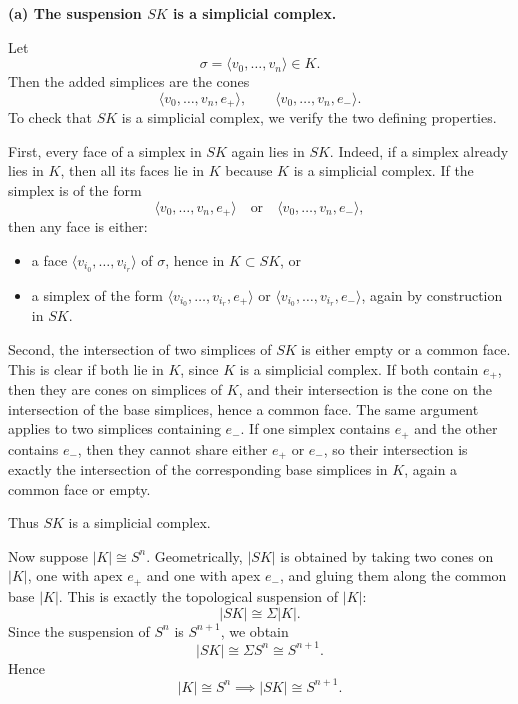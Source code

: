 \begin{solution}

\par

\textbf{(a) The suspension \(SK\) is a simplicial complex.}

Let
\[
\sigma=\langle v_0,\dots,v_n\rangle\in K.
\]
Then the added simplices are the cones
\[
\langle v_0,\dots,v_n,e_+\rangle,
\qquad
\langle v_0,\dots,v_n,e_-\rangle.
\]
To check that \(SK\) is a simplicial complex, we verify the two defining properties.

First, every face of a simplex in \(SK\) again lies in \(SK\). Indeed, if a simplex already lies in \(K\), then all its faces lie in \(K\) because \(K\) is a simplicial complex. If the simplex is of the form
\[
\langle v_0,\dots,v_n,e_+\rangle
\quad\text{or}\quad
\langle v_0,\dots,v_n,e_-\rangle,
\]
then any face is either:

\begin{itemize}
	\item a face \(\langle v_{i_0},\dots,v_{i_r}\rangle\) of \(\sigma\), hence in \(K\subset SK\), or
	\item a simplex of the form \(\langle v_{i_0},\dots,v_{i_r},e_+\rangle\) or \(\langle v_{i_0},\dots,v_{i_r},e_-\rangle\), again by construction in \(SK\).
\end{itemize}

Second, the intersection of two simplices of \(SK\) is either empty or a common face. This is clear if both lie in \(K\), since \(K\) is a simplicial complex. If both contain \(e_+\), then they are cones on simplices of \(K\), and their intersection is the cone on the intersection of the base simplices, hence a common face. The same argument applies to two simplices containing \(e_-\). If one simplex contains \(e_+\) and the other contains \(e_-\), then they cannot share either \(e_+\) or \(e_-\), so their intersection is exactly the intersection of the corresponding base simplices in \(K\), again a common face or empty.

Thus \(SK\) is a simplicial complex.

\par

Now suppose \(|K|\cong S^n\). Geometrically, \(|SK|\) is obtained by taking two cones on \(|K|\), one with apex \(e_+\) and one with apex \(e_-\), and gluing them along the common base \(|K|\). This is exactly the topological suspension of \(|K|\):
\[
|SK|\cong \Sigma |K|.
\]
Since the suspension of \(S^n\) is \(S^{n+1}\), we obtain
\[
|SK|\cong \Sigma S^n\cong S^{n+1}.
\]
Hence
\[
\boxed{|K|\cong S^n \implies |SK|\cong S^{n+1}.}
\]


\end{solution}
